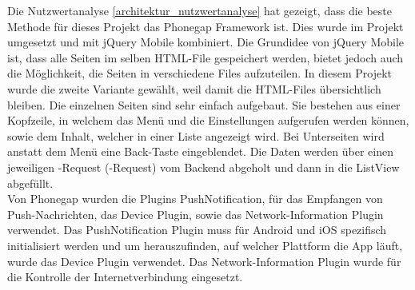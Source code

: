 Die Nutzwertanalyse \ref{architektur_nutzwertanalyse} hat gezeigt, dass die beste Methode für dieses Projekt das Phonegap Framework ist. Dies wurde im Projekt umgesetzt und mit jQuery Mobile kombiniert. Die Grundidee von jQuery Mobile ist, dass alle Seiten im selben HTML-File gespeichert werden, bietet jedoch auch die Möglichkeit, die Seiten in verschiedene Files aufzuteilen. In diesem Projekt wurde die zweite Variante gewählt, weil damit die HTML-Files übersichtlich bleiben. Die einzelnen Seiten sind sehr einfach aufgebaut. Sie bestehen aus einer Kopfzeile, in welchem das Menü und die Einstellungen aufgerufen werden können, sowie dem Inhalt, welcher in einer Liste angezeigt wird. Bei Unterseiten wird anstatt dem Menü eine Back-Taste eingeblendet. Die Daten werden über einen jeweiligen -Request (-Request) vom Backend abgeholt und dann in die ListView abgefüllt.\\

Von Phonegap wurden die Plugins PushNotification, für das Empfangen von Push-Nachrichten, das Device Plugin, sowie das Network-Information Plugin verwendet. Das PushNotification Plugin muss für Android und iOS spezifisch initialisiert werden und um herauszufinden, auf welcher Plattform die App läuft, wurde das Device Plugin verwendet. Das Network-Information Plugin wurde für die Kontrolle der Internetverbindung eingesetzt.\\



